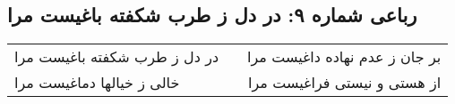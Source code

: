 \begin{center}
\section*{رباعی شماره ۹: در دل ز طرب شکفته باغیست مرا}
\label{sec:sh009}
\begin{longtable}{l p{0.5cm} r}
در دل ز طرب شکفته باغیست مرا
&&
بر جان ز عدم نهاده داغیست مرا
\\
خالی ز خیالها دماغیست مرا
&&
از هستی و نیستی فراغیست مرا
\\
\end{longtable}
\end{center}
